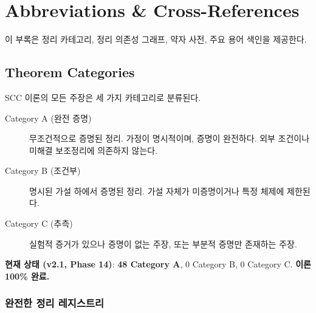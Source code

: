 
\chapter{Abbreviations \& Cross-References}
\label{app:cross-ref}

이 부록은 정리 카테고리, 정리 의존성 그래프, 약자 사전, 주요 용어 색인을 제공한다.


\section{Theorem Categories}
\label{app:theorem-categories}

SCC 이론의 모든 주장은 세 가지 카테고리로 분류된다.

\begin{description}
    \item[Category A (완전 증명)] 무조건적으로 증명된 정리. 가정이 명시적이며, 증명이 완전하다. 외부 조건이나 미해결 보조정리에 의존하지 않는다.

    \item[Category B (조건부)] 명시된 가설 하에서 증명된 정리. 가설 자체가 미증명이거나 특정 체제에 제한된다.

    \item[Category C (추측)] 실험적 증거가 있으나 증명이 없는 주장, 또는 부분적 증명만 존재하는 주장.
\end{description}

\textbf{현재 상태 (v2.1, Phase 14)}: \textbf{48 Category A}, 0 Category B, 0 Category C. \textbf{이론 100\% 완료.}


\subsection{완전한 정리 레지스트리}

